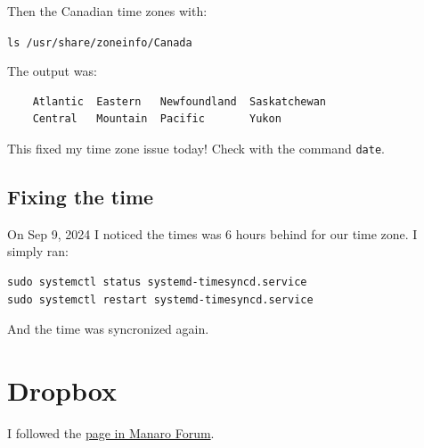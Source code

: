 \documentclass[]{scrartcl}
\begin{document}
Then the Canadian time zones with:

\verb|ls /usr/share/zoneinfo/Canada|

The output was:

\begin{verbatim}
	Atlantic  Eastern   Newfoundland  Saskatchewan
	Central   Mountain  Pacific       Yukon
\end{verbatim}

This fixed my time zone issue today! Check with the command \texttt{date}.


\subsection{Fixing the time}

On Sep 9, 2024 I noticed the times was 6 hours behind for our time zone.
I simply ran:

\begin{verbatim}
sudo systemctl status systemd-timesyncd.service
sudo systemctl restart systemd-timesyncd.service

\end{verbatim}

And the time was syncronized again.



\section{Dropbox}

I followed the \href{https://forum.manjaro.org/t/dropbox-install-new-to-manjaro/9576/5}{page in Manaro Forum}.
\end{document}
